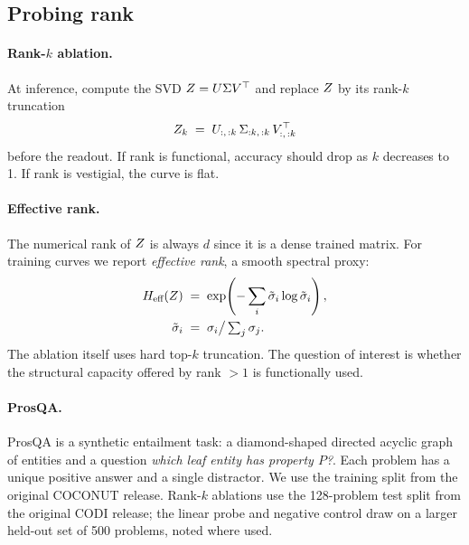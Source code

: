 \subsection{Probing rank}

\paragraph{Rank-$k$ ablation.} At inference, compute the SVD
$Z = U\Sigma V^\top$ and replace $Z$ by its rank-$k$ truncation
\[
Z_k \;=\; U_{:,\,:k}\,\Sigma_{:k,\,:k}\,V_{:,\,:k}^\top
\]
before the readout. If rank is functional, accuracy should drop
as $k$ decreases to 1. If rank is vestigial, the curve is flat.

\paragraph{Effective rank.} The numerical rank of $Z$ is always
$d$ since it is a dense trained matrix. For training curves we
report \emph{effective rank}, a smooth spectral proxy:
\begin{align*}
H_{\text{eff}}(Z) &\;=\; \exp\!\left(-\sum_i \tilde\sigma_i \log \tilde\sigma_i\right),\\
\tilde\sigma_i &\;=\; \sigma_i \big/ \textstyle\sum_j \sigma_j.
\end{align*}
The ablation itself uses hard top-$k$ truncation. The question of
interest is whether the structural capacity offered by rank $>1$
is functionally used.

\paragraph{ProsQA.} ProsQA \citep{hao2024coconut} is a synthetic
entailment task: a diamond-shaped directed acyclic graph of
entities and a question \emph{which leaf entity has property $P$?}.
Each problem has a unique positive answer and a single distractor.
We use the training split from the original COCONUT release. Rank-$k$
ablations use the 128-problem test split from the original CODI
release; the linear probe and negative control draw on a larger
held-out set of 500 problems, noted where used.
